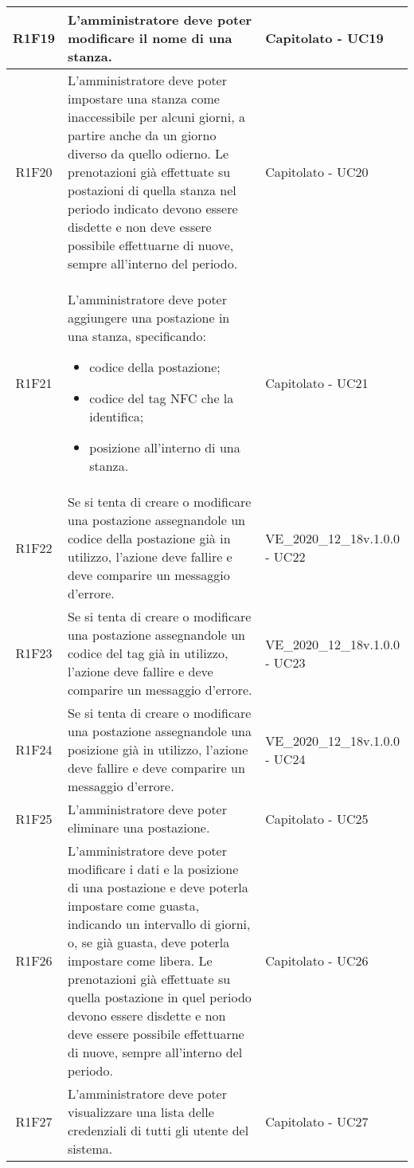 \begin{center}
\begin{longtable}{|c|p{10cm}|p{4cm}|}
		\hline
		R1F19&L'amministratore deve poter modificare il nome di una stanza.	& Capitolato - UC19	\\
		\hline
		R1F20&L'amministratore deve poter impostare una stanza come inaccessibile per alcuni giorni, a partire anche da un giorno diverso da quello odierno. Le prenotazioni già effettuate su postazioni di quella stanza nel periodo indicato devono essere disdette e non deve essere possibile effettuarne di nuove, sempre all'interno del periodo.& Capitolato - UC20	\\
		\hline
		R1F21&L'amministratore deve poter aggiungere una postazione in una stanza, specificando:
		\begin{itemize}
			\item codice della postazione;
			\item codice del tag NFC che la identifica;
			\item posizione all'interno di una stanza.
		\end{itemize} & Capitolato - UC21	\\
		\hline
		R1F22&	Se si tenta di creare o modificare una postazione assegnandole un codice della postazione già in utilizzo, l'azione deve fallire e deve comparire un messaggio d'errore.& VE\_2020\_12\_18v.1.0.0 - UC22 	\\
		\hline
		R1F23&Se si tenta di creare o modificare una postazione assegnandole un codice del tag già in utilizzo, l'azione deve fallire e deve comparire un messaggio d'errore.	&VE\_2020\_12\_18v.1.0.0 - UC23 	\\
		\hline
		R1F24&Se si tenta di creare o modificare una postazione assegnandole una posizione già in utilizzo, l'azione deve fallire e deve comparire un messaggio d'errore.	&VE\_2020\_12\_18v.1.0.0 - UC24 	\\
		\hline
		R1F25&L'amministratore deve poter eliminare una postazione.	& Capitolato - UC25	\\
		\hline
		R1F26&L'amministratore deve poter modificare i dati e la posizione di una postazione e deve poterla impostare come guasta, indicando un intervallo di giorni, o, se già guasta, deve poterla impostare come libera. Le prenotazioni già effettuate su quella postazione in quel periodo devono essere disdette e non deve essere possibile effettuarne di nuove, sempre all'interno del periodo.	& Capitolato - UC26	\\
		\hline
		R1F27&L'amministratore deve poter visualizzare una lista delle credenziali di tutti gli utente del sistema.	& Capitolato - UC27	\\

\end{longtable}
\end{center}
